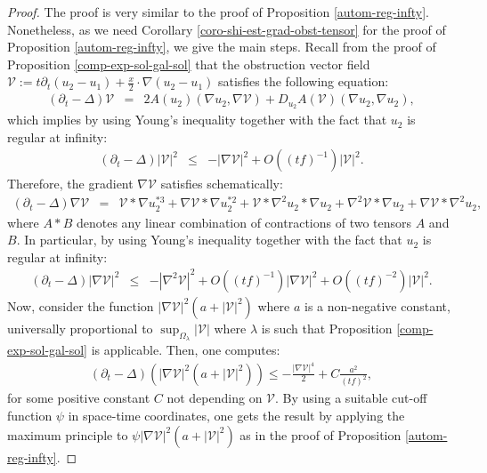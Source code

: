 \documentclass[a4paper,11pt,reqno]{amsart}
\newcommand{\Ob}{\mathcal{V}}
\begin{document}
\begin{proof}
The proof is very similar to the proof of Proposition \ref{autom-reg-infty}. Nonetheless, as we need Corollary \ref{coro-shi-est-grad-obst-tensor} for the proof of Proposition \ref{autom-reg-infty}, we give the main steps. Recall from the proof of Proposition \ref{comp-exp-sol-gal-sol} that the obstruction vector field $\Ob:= t\partial_t(u_2-u_1)+\frac{x}{2}\cdot\nabla (u_2-u_1)$ satisfies the following equation:
\begin{eqnarray*}
(\partial_t-\Delta)\Ob&=&2A(u_2)(\nabla u_2,\nabla \Ob)+D_{u_2}A(\Ob)(\nabla u_2,\nabla u_2),
\end{eqnarray*}
which implies by using Young's inequality together with the fact that $u_2$ is regular at infinity:
\begin{eqnarray*}
(\partial_t-\Delta)|\Ob|^2&\leq&-|\nabla\Ob|^2+\textit{O}\left((tf)^{-1}\right)|\Ob|^2.
\end{eqnarray*}
Therefore, the gradient $\nabla \Ob$ satisfies schematically:
\begin{eqnarray*}
(\partial_t-\Delta)\nabla\Ob&=&\Ob\ast\nabla u_2^{*3}+\nabla\Ob\ast\nabla u_2^{*2}+\Ob\ast\nabla^2u_2\ast\nabla u_2+\nabla^2\Ob\ast\nabla u_2+\nabla\Ob\ast\nabla^2u_2,
\end{eqnarray*}
where $A\ast B$ denotes any linear combination of contractions of two tensors $A$ and $B$. In particular, by using Young's inequality together with the fact that $u_2$ is regular at infinity:
\begin{eqnarray*}
(\partial_t-\Delta)|\nabla\Ob|^2&\leq&-|\nabla^2\Ob|^2+\textit{O}\left((tf)^{-1}\right)|\nabla\Ob|^2+\textit{O}\left((tf)^{-2}\right)|\Ob|^2.
\end{eqnarray*}
Now, consider the function $|\nabla\Ob|^2(a+|\Ob|^2)$ where $a$ is a non-negative constant, universally proportional to $\sup_{\Omega_{\lambda}}|\Ob|$ where $\lambda$ is such that Proposition \ref{comp-exp-sol-gal-sol} is applicable. Then, one computes:
\begin{eqnarray*}
(\partial_t-\Delta)\left(|\nabla\Ob|^2(a+|\Ob|^2)\right)\leq -\frac{|\nabla\Ob|^4}{2}+C\frac{a^2}{(tf)^2},
\end{eqnarray*}
for some positive constant $C$ not depending on $\Ob$. By using a suitable cut-off function $\psi$ in space-time coordinates, one gets the result by applying the maximum principle to $\psi|\nabla\Ob|^2(a+|\Ob|^2)$ as in the proof of Proposition \ref{autom-reg-infty}.
\end{proof}
 
\end{document}

